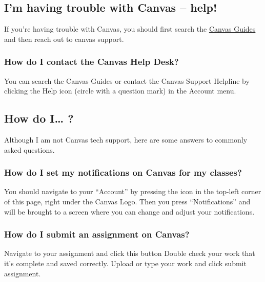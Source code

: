\documentclass[
]{book}
\begin{document}
\hypertarget{im-having-trouble-with-canvas-help}{%
\subsection{I'm having trouble with Canvas -- help!}\label{im-having-trouble-with-canvas-help}}

If you're having trouble with Canvas, you should first search the \href{https://community.canvaslms.com/t5/Canvas-Basics-Guide/tkb-p/basics}{Canvas Guides} and then reach out to canvas support.

\hypertarget{how-do-i-contact-the-canvas-help-desk}{%
\subsubsection{How do I contact the Canvas Help Desk?}\label{how-do-i-contact-the-canvas-help-desk}}

You can search the Canvas Guides or contact the Canvas Support Helpline by clicking the Help icon (circle with a question mark) in the Account menu.

\hypertarget{how-do-i}{%
\subsection{How do I\ldots{} ?}\label{how-do-i}}

Although I am not Canvas tech support, here are some answers to commonly asked questions.

\hypertarget{how-do-i-set-my-notifications-on-canvas-for-my-classes}{%
\subsubsection{How do I set my notifications on Canvas for my classes?}\label{how-do-i-set-my-notifications-on-canvas-for-my-classes}}

You should navigate to your ``Account'' by pressing the icon in the top-left corner of this page, right under the Canvas Logo. Then you press ``Notifications'' and will be brought to a screen where you can change and adjust your notifications.

\hypertarget{how-do-i-submit-an-assignment-on-canvas}{%
\subsubsection{How do I submit an assignment on Canvas?}\label{how-do-i-submit-an-assignment-on-canvas}}

Navigate to your assignment and click this button
Double check your work that it's complete and saved correctly.
Upload or type your work and click submit assignment.
\end{document}
